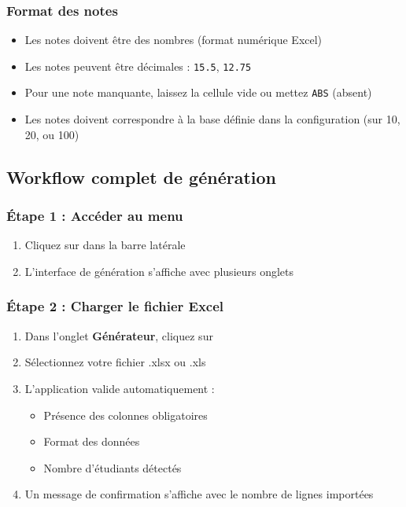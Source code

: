 
\subsubsection{Format des notes}

\begin{itemize}[leftmargin=*]
    \item Les notes doivent être des nombres (format numérique Excel)
    \item Les notes peuvent être décimales : \texttt{15.5}, \texttt{12.75}
    \item Pour une note manquante, laissez la cellule vide ou mettez \texttt{ABS} (absent)
    \item Les notes doivent correspondre à la base définie dans la configuration (sur 10, 20, ou 100)
\end{itemize}

\subsection{Workflow complet de génération}

\subsubsection{Étape 1 : Accéder au menu}

\begin{enumerate}[leftmargin=*]
    \item Cliquez sur  dans la barre latérale
    \item L'interface de génération s'affiche avec plusieurs onglets
\end{enumerate}

\subsubsection{Étape 2 : Charger le fichier Excel}

\begin{enumerate}[leftmargin=*]
    \item Dans l'onglet \textbf{Générateur}, cliquez sur 
    \item Sélectionnez votre fichier .xlsx ou .xls
    \item L'application valide automatiquement :
    \begin{itemize}
        \item Présence des colonnes obligatoires
        \item Format des données
        \item Nombre d'étudiants détectés
    \end{itemize}
    \item Un message de confirmation s'affiche avec le nombre de lignes importées
\end{enumerate}

